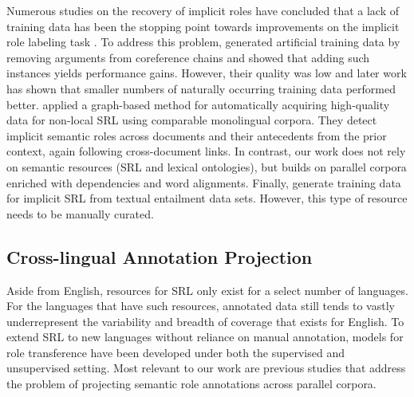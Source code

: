 \documentclass[11pt]{article}
\begin{document}
Numerous 
studies on the recovery of implicit roles have concluded that a lack of training data has been the stopping point towards improvements on the implicit role labeling task \cite{gorinski2013towards,laparra2013impar}. To address this problem,
 generated artificial training data by removing arguments from coreference chains and showed that adding such instances yields performance gains. 
However, their quality was low and later work \cite{rothfrank2015} has shown that smaller numbers of naturally occurring training data performed better.
 applied a graph-based method for automatically acquiring high-quality data for non-local SRL using comparable monolingual corpora. They detect implicit semantic roles across documents and their antecedents from the prior context, again following cross-document links. In contrast, our work does not rely on semantic resources (SRL and lexical ontologies), but builds on parallel corpora enriched with dependencies and word alignments.
Finally,  generate training data for implicit SRL from textual entailment data sets. However, this type of resource needs to be manually curated.

\subsection{Cross-lingual Annotation Projection}

Aside from English, resources for SRL only exist for a select number of languages. For the languages that have such resources, annotated data still tends to vastly underrepresent the variability and breadth of coverage that exists for English. To extend SRL to new languages without reliance on manual annotation, models for role transference have been developed under both the supervised
\cite{pado2009cross,akbikgenerating} and unsupervised \cite{kozhevnikov2013cross}  setting. Most relevant to our work are previous studies that address the problem of projecting semantic role annotations across parallel corpora.
\end{document}
